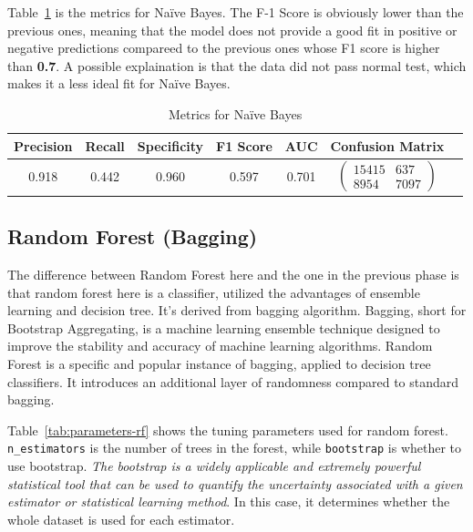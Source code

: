 Table~\ref{tab:nb} is the metrics for Na\"ive Bayes. The F-1 Score is obviously lower than the previous ones, meaning that the model does not provide a good fit in positive or negative predictions compareed to the previous ones whose F1 score is higher than \textbf{0.7}. A possible explaination is that the data did not pass normal test, which makes it a less ideal fit for Na\"ive Bayes.

\begin{table}
\centering
\begin{tabular}{|c|c|c|c|c|c|c}
\hline
\textbf{Precision} & \textbf{Recall} & \textbf{Specificity} & \textbf{F1 Score} & \textbf{AUC} & \textbf{Confusion Matrix} \\
\hline
0.918 & 0.442 & 0.960 & 0.597 & 0.701 & $\left(\begin{array}{cc} 15415 & 637 \\ 8954 & 7097 \end{array}\right)$ \\ 
\hline
\end{tabular}
\caption{Metrics for Na\"ive Bayes}
\label{tab:nb}
\end{table}

\subsection{Random Forest (Bagging)}

The difference between Random Forest here and the one in the previous phase is that random forest here is a classifier, utilized the advantages of ensemble learning and decision tree. It's derived from bagging algorithm. Bagging, short for Bootstrap Aggregating, is a machine learning ensemble technique designed to improve the stability and accuracy of machine learning algorithms. Random Forest is a specific and popular instance of bagging, applied to decision tree classifiers. It introduces an additional layer of randomness compared to standard bagging.

Table~\ref{tab:parameters-rf} shows the tuning parameters used for random forest. \texttt{n\_estimators} is the number of trees in the forest, while \texttt{bootstrap} is whether to use bootstrap. \textit{The bootstrap is a widely applicable and extremely powerful statistical tool that can be used to quantify the uncertainty associated with a given estimator or statistical learning method}\cite{james2023introduction_bootstrap}. In this case, it determines whether the whole dataset is used for each estimator.

